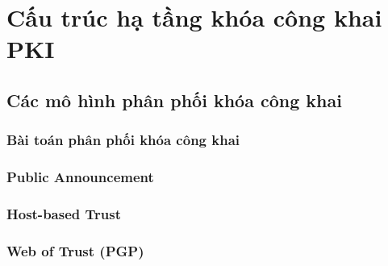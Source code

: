 \chapter{Cấu trúc hạ tầng khóa công khai PKI}
\label{chap:pki-arch}



\section{Các mô hình phân phối khóa công khai}
\label{sec:3.1}

\subsection{Bài toán phân phối khóa công khai}

\subsection{Public Announcement}

\subsection{Host-based Trust}

\subsection{Web of Trust (PGP)}

